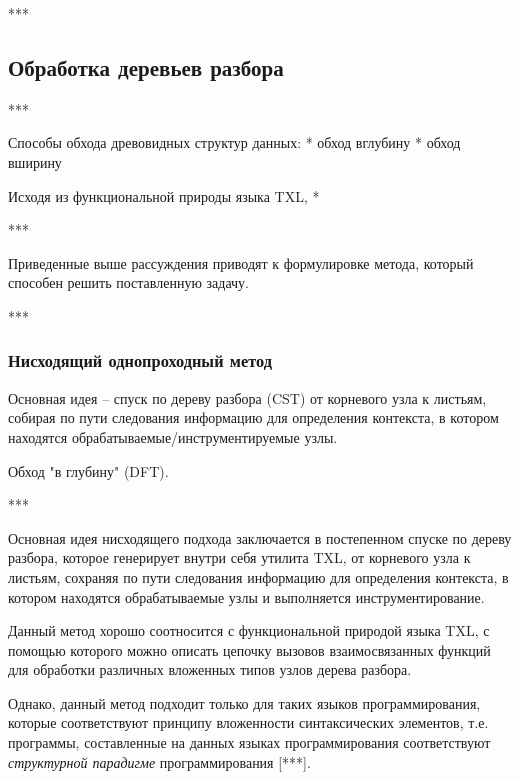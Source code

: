 ***

\subsection{Обработка деревьев разбора}

***

Способы обхода древовидных структур данных:
* обход вглубину
* обход вширину

Исходя из функциональной природы языка TXL, *

***

Приведенные выше рассуждения приводят к формулировке метода, который способен решить поставленную задачу.

***

\subsubsection{Нисходящий однопроходный метод}

Основная идея -- спуск по дереву разбора (CST) от корневого узла к листьям, собирая по пути следования информацию для определения контекста, в котором находятся обрабатываемые/инструментируемые узлы.

Обход "в глубину" (DFT).

***

Основная идея нисходящего подхода заключается в постепенном спуске по дереву разбора, которое генерирует внутри себя утилита TXL, от корневого узла к листьям, сохраняя по пути следования информацию для определения контекста, в котором находятся обрабатываемые узлы и выполняется инструментирование.

Данный метод хорошо соотносится с функциональной природой языка TXL, с помощью которого можно описать цепочку вызовов взаимосвязанных функций для обработки различных вложенных типов узлов дерева разбора.

Однако, данный метод подходит только для таких языков программирования, которые соответствуют принципу вложенности синтаксических элементов, т.е. программы, составленные на данных языках программирования соответствуют \textit{структурной парадигме} программирования [***].

